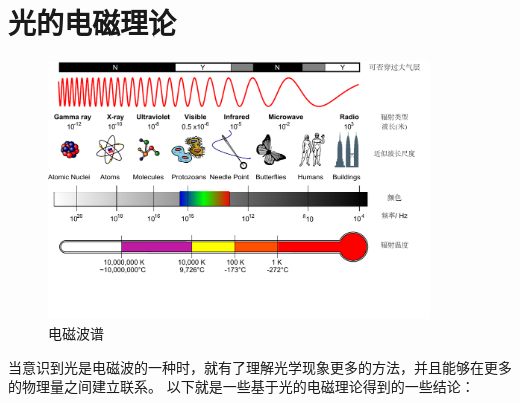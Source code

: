 \section{光的电磁理论}
\begin{figure}[htb]
\centering
\includegraphics[width=0.9\textwidth]{images/em-theory-3.pdf}
\caption{电磁波谱}
\label{fig: em-theory-3}
\end{figure}
当意识到光是电磁波的一种时，就有了理解光学现象更多的方法，并且能够在更多的物理量之间建立联系。
以下就是一些基于光的电磁理论得到的一些结论：

